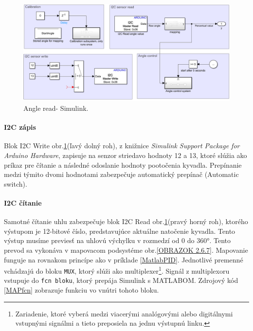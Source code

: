 \begin{figure}[!tbh]
	\centering
	\includegraphics[width=\textwidth]{obr/AngleRead.png}
	\caption{Angle read- Simulink.}\label{OBRAZOK 2.6.6}
\end{figure}


\paragraph{I2C zápis}

Blok I2C Write obr.\ref{OBRAZOK 2.6.6}(ľavý dolný roh), z knižnice \textit{Simulink Support Package for Arduino Hardware}, zapisuje na senzor striedavo hodnoty 12 a 13, ktoré slúžia ako príkaz pre čítanie a následné odoslanie hodnoty pootočenia kyvadla. Prepínanie medzi týmito dvomi hodnotami zabezpečuje automatický prepínač (Automatic switch). 

\paragraph{I2C čítanie}

Samotné čítanie uhlu zabezpečuje blok I2C Read obr.\ref{OBRAZOK 2.6.6}(pravý horný roh), ktorého výstupom je 12-bitové číslo, predstavujúce aktuálne natočenie kyvadla. Tento výstup musíme previesť na uhlovú výchylku v rozmedzí od 0 do 360°. Tento prevod sa vykonáva v mapovacom podsystéme obr.\ref{OBRAZOK 2.6.7}. Mapovanie funguje na rovnakom princípe ako v príklade \ref{MatlabPID}. Jednotlivé premenné vchádzajú do bloku \verb*|MUX|, ktorý slúži ako multiplexer\footnote[12]{Zariadenie, ktoré vyberá medzi viacerými analógovými alebo digitálnymi vstupnými signálmi a tieto preposiela na jednu výstupnú linku.}. Signál z multiplexoru vstupuje do \verb|fcn bloku|, ktorý prepája Simulink s MATLABOM. Zdrojový kód \ref{MAPfcn} zobrazuje funkciu vo vnútri tohoto bloku. 


